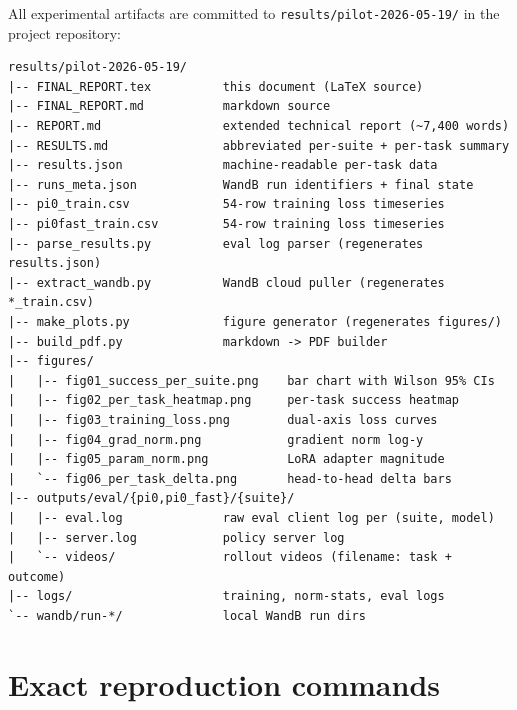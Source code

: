 \documentclass[11pt,letterpaper]{article}
\begin{document}
All experimental artifacts are committed to \texttt{results/pilot-2026-05-19/} in the project repository:

\begin{lstlisting}
results/pilot-2026-05-19/
|-- FINAL_REPORT.tex          this document (LaTeX source)
|-- FINAL_REPORT.md           markdown source
|-- REPORT.md                 extended technical report (~7,400 words)
|-- RESULTS.md                abbreviated per-suite + per-task summary
|-- results.json              machine-readable per-task data
|-- runs_meta.json            WandB run identifiers + final state
|-- pi0_train.csv             54-row training loss timeseries
|-- pi0fast_train.csv         54-row training loss timeseries
|-- parse_results.py          eval log parser (regenerates results.json)
|-- extract_wandb.py          WandB cloud puller (regenerates *_train.csv)
|-- make_plots.py             figure generator (regenerates figures/)
|-- build_pdf.py              markdown -> PDF builder
|-- figures/
|   |-- fig01_success_per_suite.png    bar chart with Wilson 95% CIs
|   |-- fig02_per_task_heatmap.png     per-task success heatmap
|   |-- fig03_training_loss.png        dual-axis loss curves
|   |-- fig04_grad_norm.png            gradient norm log-y
|   |-- fig05_param_norm.png           LoRA adapter magnitude
|   `-- fig06_per_task_delta.png       head-to-head delta bars
|-- outputs/eval/{pi0,pi0_fast}/{suite}/
|   |-- eval.log              raw eval client log per (suite, model)
|   |-- server.log            policy server log
|   `-- videos/               rollout videos (filename: task + outcome)
|-- logs/                     training, norm-stats, eval logs
`-- wandb/run-*/              local WandB run dirs
\end{lstlisting}

\section{Exact reproduction commands}
\end{document}

